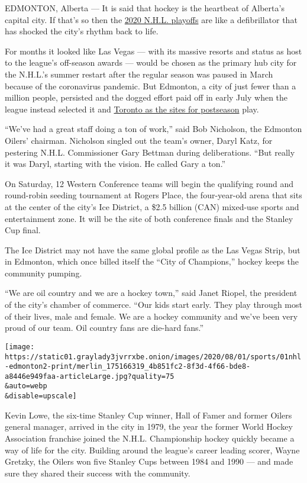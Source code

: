 EDMONTON, Alberta --- It is said that hockey is the heartbeat of
Alberta's capital city. If that's so then the
\href{https://www.nytimes3xbfgragh.onion/2020/07/06/sports/hockey/nhl-playoffs.html}{2020
N.H.L. playoffs} are like a defibrillator that has shocked the city's
rhythm back to life.

For months it looked like Las Vegas --- with its massive resorts and
status as host to the league's off-season awards --- would be chosen as
the primary hub city for the N.H.L.'s summer restart after the regular
season was paused in March because of the coronavirus pandemic. But
Edmonton, a city of just fewer than a million people, persisted and the
dogged effort paid off in early July when the league instead selected it
and
\href{https://www.nytimes3xbfgragh.onion/2020/08/04/sports/toronto-nhl-playoffs.html}{Toronto
as the sites for postseason} play.

``We've had a great staff doing a ton of work,'' said Bob Nicholson, the
Edmonton Oilers' chairman. Nicholson singled out the team's owner, Daryl
Katz, for pestering N.H.L. Commissioner Gary Bettman during
deliberations. ``But really it was Daryl, starting with the vision. He
called Gary a ton.''

On Saturday, 12 Western Conference teams will begin the qualifying round
and round-robin seeding tournament at Rogers Place, the four-year-old
arena that sits at the center of the city's Ice District, a \$2.5
billion (CAN) mixed-use sports and entertainment zone. It will be the
site of both conference finals and the Stanley Cup final.

The Ice District may not have the same global profile as the Las Vegas
Strip, but in Edmonton, which once billed itself the ``City of
Champions,'' hockey keeps the community pumping.

``We are oil country and we are a hockey town,'' said Janet Riopel, the
president of the city's chamber of commerce. ``Our kids start early.
They play through most of their lives, male and female. We are a hockey
community and we've been very proud of our team. Oil country fans are
die-hard fans.''

\texttt{[image: https://static01.graylady3jvrrxbe.onion/images/2020/08/01/sports/01nhl-edmonton2-print/merlin\_175166319\_4b851fc2-8f3d-4f66-bde8-a8446e949faa-articleLarge.jpg?quality=75\\\&auto=webp\\\&disable=upscale]}

Kevin Lowe, the six-time Stanley Cup winner, Hall of Famer and former
Oilers general manager, arrived in the city in 1979, the year the former
World Hockey Association franchise joined the N.H.L. Championship hockey
quickly became a way of life for the city. Building around the league's
career leading scorer, Wayne Gretzky, the Oilers won five Stanley Cups
between 1984 and 1990 --- and made sure they shared their success with
the community.

